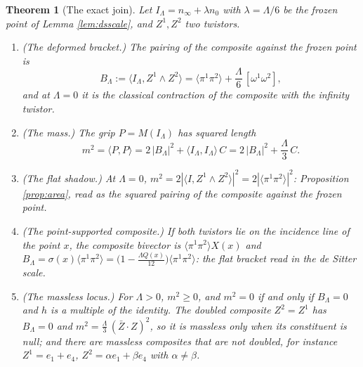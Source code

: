 \documentclass[11pt]{article}
\newtheorem{theorem}{Theorem}[section]
\theoremstyle{definition}
\newcommand{\ip}[2]{\langle #1, #2\rangle}
\newcommand{\br}[1]{\langle #1\rangle}
\begin{document}
\begin{theorem}[The exact join]\label{thm:grip}
Let $I_{\Lambda} = n_{\infty} + \lambda n_{0}$ with $\lambda = \Lambda/6$ be the frozen point of Lemma \ref{lem:dsscale}, and $Z^{1}, Z^{2}$ two twistors.
\begin{enumerate}
\item \emph{(The deformed bracket.)} The pairing of the composite against the frozen point is
\begin{equation}\label{eq:blambda}
B_{\Lambda} := \ip{I_{\Lambda}}{Z^{1}\wedge Z^{2}} = \br{\pi^{1}\pi^{2}} + \frac{\Lambda}{6}\,[\omega^{1}\omega^{2}],
\end{equation}
and at $\Lambda = 0$ it is the classical contraction of the composite with the infinity twistor.
\item \emph{(The mass.)} The grip $P = M(I_{\Lambda})$ has squared length
\begin{equation}\label{eq:grip}
m^{2} = \ip{P}{P} = 2\,|B_{\Lambda}|^{2} + \ip{I_{\Lambda}}{I_{\Lambda}}\, C = 2\,|B_{\Lambda}|^{2} + \frac{\Lambda}{3}\, C .
\end{equation}
\item \emph{(The flat shadow.)} At $\Lambda = 0$, $m^{2} = 2|\ip{I}{Z^{1}\wedge Z^{2}}|^{2} = 2|\br{\pi^{1}\pi^{2}}|^{2}$: Proposition \ref{prop:area}, read as the squared pairing of the composite against the frozen point.
\item \emph{(The point-supported composite.)} If both twistors lie on the incidence line of the point $x$, the composite bivector is $\br{\pi^{1}\pi^{2}}X(x)$ and $B_{\Lambda} = \sigma(x)\br{\pi^{1}\pi^{2}} = \bigl(1 - \tfrac{\Lambda Q(x)}{12}\bigr)\br{\pi^{1}\pi^{2}}$: the flat bracket read in the de Sitter scale.
\item \emph{(The massless locus.)} For $\Lambda > 0$, $m^{2} \ge 0$, and $m^{2} = 0$ if and only if $B_{\Lambda} = 0$ and $h$ is a multiple of the identity. The doubled composite $Z^{2} = Z^{1}$ has $B_{\Lambda} = 0$ and $m^{2} = \tfrac{\Lambda}{3}\,(\bar{Z}\cdot Z)^{2}$, so it is massless only when its constituent is null; and there are massless composites that are not doubled, for instance $Z^{1} = e_{1} + e_{4}$, $Z^{2} = \alpha e_{1} + \beta e_{4}$ with $\alpha \neq \beta$.
\end{enumerate}
\end{theorem}
\end{document}
